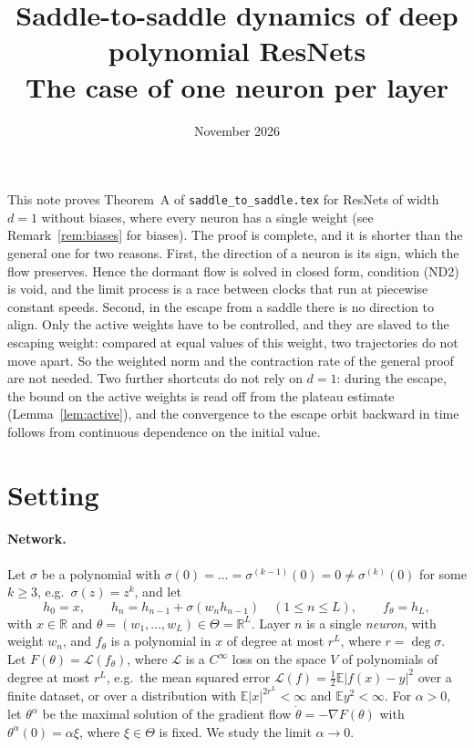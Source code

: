 \documentclass[11pt]{article}
\title{Saddle-to-saddle dynamics of deep polynomial ResNets\\[4pt]\large The case of one neuron per layer}
\author{}
\date{November 2026}
\theoremstyle{definition}
\theoremstyle{remark}
\newcommand{\R}{\mathbb{R}}
\newcommand{\E}{\mathbb{E}}
\newcommand{\cL}{\mathcal{L}}
\newcommand{\ND}[1]{\textup{(ND#1)}}
\begin{document}
\maketitle

\noindent
This note proves Theorem~A of \texttt{saddle\_to\_saddle.tex} for ResNets of width $d=1$ without biases, where every neuron has a single weight (see Remark~\ref{rem:biases} for biases). The proof is complete, and it is shorter than the general one for two reasons. First, the direction of a neuron is its sign, which the flow preserves. Hence the dormant flow is solved in closed form, condition \ND2 is void, and the limit process is a race between clocks that run at piecewise constant speeds. Second, in the escape from a saddle there is no direction to align. Only the active weights have to be controlled, and they are slaved to the escaping weight: compared at equal values of this weight, two trajectories do not move apart. So the weighted norm and the contraction rate of the general proof are not needed. Two further shortcuts do not rely on $d=1$: during the escape, the bound on the active weights is read off from the plateau estimate (Lemma~\ref{lem:active}), and the convergence to the escape orbit backward in time follows from continuous dependence on the initial value.

\section{Setting}

\paragraph{Network.} Let $\sigma$ be a polynomial with $\sigma(0)=\dots=\sigma^{(k-1)}(0)=0\ne\sigma^{(k)}(0)$ for some $k\ge3$, e.g.\ $\sigma(z)=z^k$, and let
\[
h_0=x,\qquad h_n=h_{n-1}+\sigma(w_nh_{n-1})\quad(1\le n\le L),\qquad f_\theta=h_L,
\]
with $x\in\R$ and $\theta=(w_1,\dots,w_L)\in\Theta=\R^L$. Layer $n$ is a single \emph{neuron}, with weight $w_n$, and $f_\theta$ is a polynomial in $x$ of degree at most $r^L$, where $r=\deg\sigma$. Let $F(\theta)=\cL(f_\theta)$, where $\cL$ is a $C^\infty$ loss on the space $V$ of polynomials of degree at most $r^L$, e.g.\ the mean squared error $\cL(f)=\frac12\E|f(x)-y|^2$ over a finite dataset, or over a distribution with $\E|x|^{2r^L}<\infty$ and $\E y^2<\infty$. For $\alpha>0$, let $\theta^\alpha$ be the maximal solution of the gradient flow $\dot\theta=-\nabla F(\theta)$ with $\theta^\alpha(0)=\alpha\xi$, where $\xi\in\Theta$ is fixed. We study the limit $\alpha\to0$.
\end{document}
